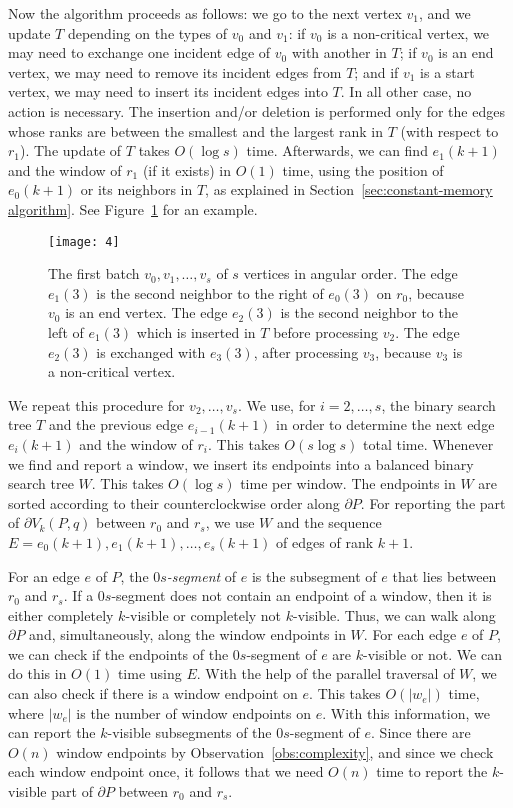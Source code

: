 \documentclass[11pt, a4paper]{article}
\begin{document}
Now the algorithm proceeds as follows: we go to the next vertex 
$v_1$, and we update $T$ depending on the types of $v_0$ and  
$v_1$: if $v_0$ is a non-critical vertex, we may need to exchange one 
incident edge of $v_0$ with another in $T$; if $v_0$ is an end vertex, 
we may need to remove its incident edges from $T$; and if 
$v_1$ is a start vertex, we may need to 
insert its incident edges into $T$.
In all other case, no action is necessary.
The insertion and/or deletion is performed only for the edges
whose ranks are between the smallest and the 
largest rank in $T$ (with respect to $r_1$). The update of $T$  
takes $O(\log s)$ time. Afterwards, we can find $e_1(k+1)$ and the 
window of $r_1$ (if it exists) in $O(1)$ time, using the position 
of $e_0(k+1)$ or its neighbors in $T$, as explained in 
Section~\ref{sec:constant-memory algorithm}.
See Figure~\ref{fig:fig4} for an example.

\begin{figure}
 \centering 
 \texttt{[image: 4]}
\caption{The first batch $v_0, v_1, \dots, v_s$ of $s$ vertices 
  in angular order. The edge $e_1(3)$ is the second neighbor to the 
  right of $e_0(3)$ on $r_0$, because $v_0$ is an end vertex. 
  The edge $e_2(3)$ is the second neighbor to the left of $e_1(3)$ 
  which is inserted in $T$ before processing $v_2$. 
  The edge $e_2(3)$ is exchanged with $e_3(3)$, after processing 
  $v_3$, because $v_3$ is a non-critical vertex.}
\label{fig:fig4}
\end{figure}


We repeat this procedure for $v_2, \dots, v_s$. We use, for 
$i = 2, \dots, s$, the binary search tree $T$ and the previous edge 
$e_{i-1}(k+1)$ in order to determine the next edge $e_i(k+1)$ and 
the window of $r_i$. This takes  $O(s \log s)$ total time. 
Whenever we find and report a window, we insert its endpoints into 
a balanced binary search tree $W$. This takes $O(\log s)$ time 
per window. The endpoints in $W$ are sorted according to 
their counterclockwise order along $\partial P$. For reporting 
the part of $\partial V_k(P, q)$ between $r_0$ and $r_s$, we use 
$W$ and the sequence $E = e_0(k + 1), e_1(k + 1), \dots, e_s(k + 1)$
of edges of rank $k+1$. 

For an edge $e$ of $P$, the 
\emph{$0s$-segment} of $e$ is the subsegment of $e$ that lies between
$r_0$ and $r_s$. If a $0s$-segment does not contain an endpoint 
of a window, then it is either completely $k$-visible or completely 
not $k$-visible. 
Thus, we can walk along $\partial P$ and, simultaneously, along the 
window endpoints in $W$. For each edge $e$ of $P$, we 
can check if the endpoints of the $0s$-segment of $e$ are $k$-visible
or not. We can do this in $O(1)$ time using $E$. With the help 
of the parallel traversal of $W$, we can also check 
if there is a window endpoint on $e$. This takes $O(|w_e|)$ 
time, where $|w_e|$ is the number of window endpoints on $e$. With 
this information, we can report the $k$-visible subsegments of 
the $0s$-segment of $e$. Since there are $O(n)$ window 
endpoints by Observation~\ref{obs:complexity},
and since we check each window endpoint once,
it follows that we need $O(n)$ time
to report the $k$-visible part of $\partial P$ between $r_0$ and 
$r_s$.
\end{document}
